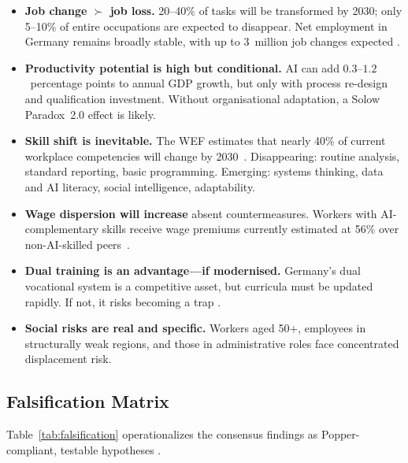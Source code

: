\documentclass[10pt,a4paper]{article}
\begin{document}
\begin{itemize}
  \item \textbf{Job change $\succ$ job loss.} 20–40\% of tasks will be transformed
        by 2030; only 5–10\% of entire occupations are expected to disappear.
        Net employment in Germany remains broadly stable, with up to 3~million
        job changes expected \citep{mckinsey2024,wef2025,iab2025}.
  \item \textbf{Productivity potential is high but conditional.} AI can add
        $0.3$–$1.2$~percentage points to annual GDP growth, but only with
        process re-design and qualification investment. Without organisational
        adaptation, a Solow Paradox~2.0 effect is likely.
  \item \textbf{Skill shift is inevitable.} The WEF estimates that nearly 40\%
        of current workplace competencies will change by 2030~\citep{wef2025}.
        Disappearing: routine analysis, standard reporting, basic programming.
        Emerging: systems thinking, data and AI literacy, social intelligence,
        adaptability.
  \item \textbf{Wage dispersion will increase} absent countermeasures. Workers
        with AI-complementary skills receive wage premiums currently estimated
        at 56\% over non-AI-skilled peers~\citep{pwc2025}.
  \item \textbf{Dual training is an advantage—if modernised.} Germany's
        dual vocational system is a competitive asset, but curricula must be
        updated rapidly. If not, it risks becoming a trap \citep{iw2025}.
  \item \textbf{Social risks are real and specific.} Workers aged 50+,
        employees in structurally weak regions, and those in administrative
        roles face concentrated displacement risk.
\end{itemize}

\subsection{Falsification Matrix}
\label{sec:falsmat}

Table~\ref{tab:falsification} operationalizes the consensus findings as
Popper-compliant, testable hypotheses \citep{popper1959}.
\end{document}
